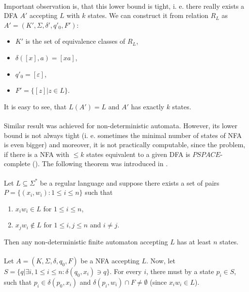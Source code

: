 \paragraph{}
Important observation is, that this lower bound is tight, i. e. there really exists a DFA $A'$ accepting $L$ with $k$ states. We can construct it from relation $R_{L}$ as $A'=(K', \Sigma , \delta ', q'_{0}, F')$:
\begin{itemize}
\item $K'$ is the set of equivalence classes of $R_{L}$, 
\item $\delta ([x], a) = [xa]$,
\item $q'_{0} = [\varepsilon ]$,
\item $F' = \{ [z] | z \in L \}$.
\end{itemize}
It is easy to see, that $L(A') = L$ and $A'$ has exactly $k$ states.

\paragraph{}
Similar result was achieved for non-deterministic automata. However, its lower bound is not always tight (i. e. sometimes the minimal number of states of NFA is even bigger) and moreover, it is not practically computable, since the problem, if there is a NFA with $\leq k$ states equivalent to a given DFA is $PSPACE$-complete (\cite{rav:minNFA}). The following theorem was introduced in \cite{gla:low}.

\paragraph{}
\cveta Let $L \subseteq \Sigma ^{*}$ be a regular language and suppose there exists a set of pairs $P=\{ (x_{i}, w_{i}): 1 \leq i \leq n\} $ such that
\begin{enumerate}
\item $x_{i}w_{i} \in L$ for $1 \leq i \leq n$,
\item $x_{j}w_{i} \notin L$ for $1 \leq i,j \leq n$ and $i \neq j$.
\end{enumerate}
Then any non-deterministic finite automaton accepting $L$ has at least $n$ states.

\paragraph{}
\dokaz Let $A=(K, \Sigma, \delta, q_{0}, F)$ be a NFA accepting $L$. Now, let $S = \{ q | \exists i, 1\leq i \leq n: \delta (q_{0}, x_{i}) \ni q \} $. For every $i$, there must by a state $p_{i} \in S$, such that $p_{i} \in \delta (p_{0}, x_{i})$ and $\delta (p_{i}, w_{i}) \cap F \neq \emptyset $ (since $x_{i}w_{i} \in L$).

